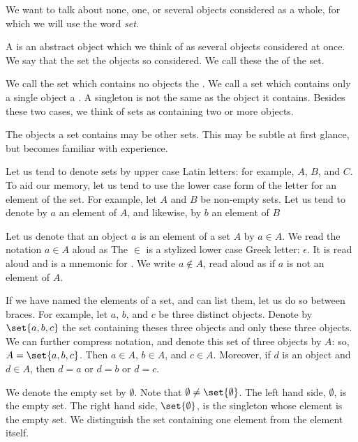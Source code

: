

We want to talk
about none, one, or
several objects considered
as a whole,
for which we will use
the word \textit{set}.


A  is an abstract
object which we think of as
several objects considered
at once.
We say that the set
the objects so considered.
We call these
the
 of the set.

We call the set which contains
no objects the
.
We call
a set which contains
only a single object a
.
A singleton is not the
same as the object
it contains.
Besides these two cases,
we think of sets
as containing
two or more objects.

The objects a set contains
may be other sets.
This may be subtle at
first glance, but becomes
familiar with experience.


Let us tend to
denote sets by
upper case Latin letters:
for example,
$A$, $B$, and $C$.
To aid our memory,
let us tend to use the lower
case form of the letter for
an element of the set.
For example,
let $A$ and $B$ be
non-empty sets.
Let us tend to denote by
$a$ an element of $A$,
and likewise,
by $b$ an element of $B$

Let us denote that
an object $a$
is an element of a set $A$
by $a \in A$.
We read the notation
$a \in A$ aloud as 
The $\in$ is a stylized
lower case Greek letter: $\epsilon$.
It is
read aloud  and
is a mnemonic for .
We write $a \not\in A$, read aloud
as  if $a$ is not
an element of $A$.

If we have named
the elements of a set,
and can list them,
let us do so between braces.
For example,
let $a$, $b$, and $c$
be three distinct objects.
Denote by $\set{a, b, c}$
the set containing theses
three objects and only these
three objects.
We can further compress notation,
and denote this set of
three objects by $A$:
so, $A = \set{a, b, c}$.
Then $a \in A$,
$b \in A$, and $c \in A$.
Moreover, if $d$
is an object and
$d \in A$, then $d = a$
or $d = b$ or $d = c$.

We denote the empty set
by $\emptyset$.
Note that
$\emptyset \neq \set{\emptyset}$.
The left hand side, $\emptyset$,
is the empty set.
The right hand side, $\set{\emptyset}$, is
the singleton whose element
is the empty set.
We distinguish the set
containing one element from the
element itself.


